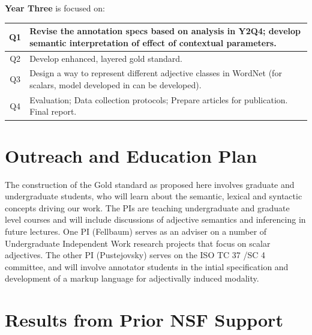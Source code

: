\documentclass[10pt]{article}
\newcommand{\miniskip}{\vspace*{1mm}}
\begin{document}
\miniskip\noindent
{\bf Year Three} is focused on:  

\vspace{1mm}\noindent
{\small
\begin{tabularx}{470pt}{|c|X|}

\hline

Q1 & Revise the annotation specs based on analysis in Y2Q4; develop semantic interpretation of effect of contextual parameters. 
\\

\hline

Q2 & Develop enhanced, layered gold standard.  \\

\hline

Q3 &   Design a way to represent different adjective classes  in WordNet (for scalars, model developed in \cite{sheinmanetal2013} can be developed). \\

\hline

Q4 &  Evaluation; Data collection protocols; Prepare articles for publication.  Final report.\\

\hline

\end{tabularx}
}



\section{Outreach and Education Plan}
The construction of the Gold standard as proposed here involves graduate and undergraduate students, who will learn about the semantic, lexical 
and syntactic concepts driving our work. The PIs are teaching undergraduate and graduate level courses and will include discussions of 
adjective semantics and inferencing in future lectures. One PI (Fellbaum) serves as an adviser on a number of Undergraduate Independent 
Work research projects that focus on scalar adjectives. The other PI (Pustejovsky) serves on the ISO TC 37 /SC 4 committee, and will involve annotator students in  the intial specification  and development of a markup language for adjectivally induced modality. 

 

\section{Results from Prior NSF Support}
\end{document}
